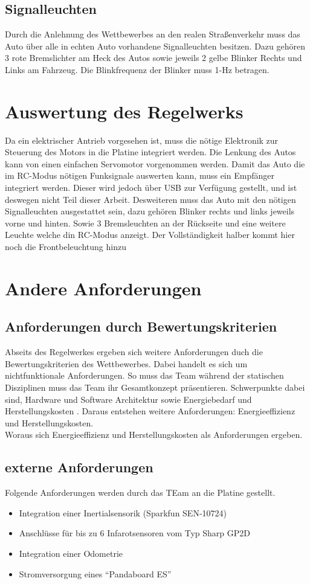 \subsection{Signalleuchten}
Durch die Anlehnung des Wettbewerbes an den realen Straßenverkehr muss das Auto über alle in echten Auto vorhandene Signalleuchten besitzen. 
Dazu gehören 3 rote Bremslichter am Heck des Autos sowie jeweils 2 gelbe Blinker Rechts und Links am Fahrzeug.  Die Blinkfrequenz der Blinker muss
1-Hz betragen.

\section{Auswertung des Regelwerks}
Da ein elektrischer Antrieb vorgesehen ist, muss die nötige Elektronik zur Steuerung des Motors in die Platine integriert werden.
Die Lenkung des Autos kann von einen einfachen Servomotor vorgenommen werden. 
Damit das Auto die im RC-Modus nötigen Funksignale auswerten kann, muss ein Empfänger integriert werden. Dieser wird jedoch über USB zur Verfügung gestellt, und ist deswegen nicht Teil dieser Arbeit.
Desweiteren muss das Auto mit den nötigen Signalleuchten ausgestattet sein, dazu gehören Blinker rechts und links jeweils vorne und hinten.
Sowie 3 Bremsleuchten an der Rückseite und eine weitere Leuchte welche din RC-Modus anzeigt. Der Vollständigkeit halber kommt hier noch die
Frontbeleuchtung hinzu


\section{Andere Anforderungen}
\subsection{Anforderungen durch Bewertungskriterien}
Abseits des Regelwerkes ergeben sich weitere Anforderungen duch die Bewertungskriterien des Wettbewerbes. Dabei handelt es sich um nichtfunktionale Anforderungen.
So muss das Team während der statischen Disziplinen muss das Team ihr Gesamtkonzept präsentieren. Schwerpunkte dabei sind, Hardware und Software Architektur sowie Energiebedarf und 
Herstellungskosten \cite{website-carolo-cup-regelwerk}. Daraus entstehen weitere Anforderungen: Energieeffizienz und Herstellungskosten. \\

Woraus sich Energieeffizienz und Herstellungskosten als Anforderungen ergeben.

\subsection{externe Anforderungen}
Folgende Anforderungen werden durch das TEam an die Platine gestellt.
\begin{itemize}
 \item Integration einer Inertialsensorik (Sparkfun SEN-10724)
 \item Anschlüsse für bis zu 6 Infarotsensoren vom Typ Sharp GP2D
 \item Integration einer Odometrie
 \item Stromversorgung eines ``Pandaboard ES'' 
\end{itemize}

